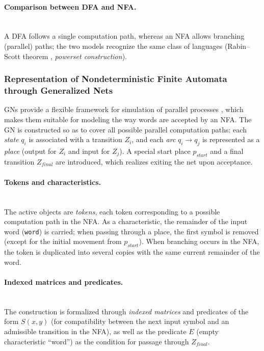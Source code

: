	\paragraph*{Comparison between DFA and NFA.}
	\mbox{}\\
	A DFA follows a single computation path, whereas an NFA allows branching (parallel) paths; the two models recognize the same class of languages (Rabin--Scott theorem \cite{DIS-rabin-scott}, \textit{powerset construction}).
	
	\subsubsection{Representation of Nondeterministic Finite Automata through Generalized Nets}
	\label{sec:simulating_automata_gn-avtoreferat}
	
	\hspace*{2.5em}GNs provide a flexible framework for simulation of parallel processes \cite{DIS-Z1,DIS-BAM}, which makes them suitable for modeling the way words are accepted by an NFA. The GN is constructed so as to cover all possible parallel computation paths: each \emph{state} $q_i$ is associated with a transition $Z_i$, and each \emph{arc} $q_i \to q_j$ is represented as a \emph{place} (output for $Z_i$ and input for $Z_j$). A special start place $p_{\textit{start}}$ and a final transition $Z_{\textit{final}}$ are introduced, which realizes exiting the net upon acceptance.
	
	\paragraph*{Tokens and characteristics.}
	\mbox{}\\
	The active objects are \emph{tokens}, each token corresponding to a possible computation path in the NFA. As a characteristic, the remainder of the input word (\texttt{word}) is carried; when passing through a place, the first symbol is removed (except for the initial movement from $p_{\textit{start}}$). When branching occurs in the NFA, the token is duplicated into several copies with the same current remainder of the word.
	
	\paragraph*{Indexed matrices and predicates.}
	\mbox{}\\
	The construction is formalized through \emph{indexed matrices} and predicates of the form $S(x,y)$ (for compatibility between the next input symbol and an admissible transition in the NFA), as well as the predicate $E$ (empty characteristic ``word'') as the condition for passage through $Z_{\textit{final}}$.
	
